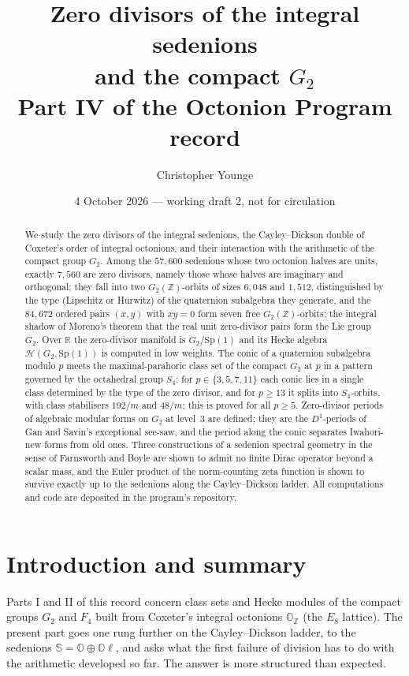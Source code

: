 \documentclass[11pt]{amsart}
\title[Zero divisors of the integral sedenions]{Zero divisors of the integral sedenions\\ and the compact $G_2$\\[4pt] {\normalsize Part IV of the Octonion Program record}}
\author{Christopher Younge}
\date{4 October 2026 --- working draft 2, not for circulation}
\theoremstyle{definition}
\renewcommand{\O}{\mathbb{O}}\newcommand{\Sd}{\mathbb{S}}\newcommand{\Hq}{\mathbb{H}}\newcommand{\Z}{\mathbb{Z}}\newcommand{\Q}{\mathbb{Q}}\newcommand{\R}{\mathbb{R}}\newcommand{\C}{\mathbb{C}}\newcommand{\F}{\mathbb{F}}
\begin{document}
\begin{abstract}
We study the zero divisors of the integral sedenions, the Cayley--Dickson double of Coxeter's order of integral octonions, and their interaction with the arithmetic of the compact group $G_2$. Among the $57{,}600$ sedenions whose two octonion halves are units, exactly $7{,}560$ are zero divisors, namely those whose halves are imaginary and orthogonal; they fall into two $G_2(\Z)$-orbits of sizes $6{,}048$ and $1{,}512$, distinguished by the type (Lipschitz or Hurwitz) of the quaternion subalgebra they generate, and the $84{,}672$ ordered pairs $(x,y)$ with $xy=0$ form seven free $G_2(\Z)$-orbits: the integral shadow of Moreno's theorem that the real unit zero-divisor pairs form the Lie group $G_2$. Over $\R$ the zero-divisor manifold is $G_2/\mathrm{Sp}(1)$ and its Hecke algebra $\mathcal H(G_2,\mathrm{Sp}(1))$ is computed in low weights. The conic of a quaternion subalgebra modulo $p$ meets the maximal-parahoric class set of the compact $G_2$ at $p$ in a pattern governed by the octahedral group $S_4$: for $p\in\{3,5,7,11\}$ each conic lies in a single class determined by the type of the zero divisor, and for $p\ge 13$ it splits into $S_4$-orbits, with class stabilisers $192/m$ and $48/m$; this is proved for all $p\ge 5$. Zero-divisor periods of algebraic modular forms on $G_2$ at level~3 are defined; they are the $D^1$-periods of Gan and Savin's exceptional see-saw, and the period along the conic separates Iwahori-new forms from old ones. Three constructions of a sedenion spectral geometry in the sense of Farnsworth and Boyle are shown to admit no finite Dirac operator beyond a scalar mass, and the Euler product of the norm-counting zeta function is shown to survive exactly up to the sedenions along the Cayley--Dickson ladder. All computations and code are deposited in the program's repository.
\end{abstract}
\maketitle
\tableofcontents

\section{Introduction and summary}
Parts I and II of this record \cite{PartI,PartII} concern class sets and Hecke modules of the compact groups $G_2$ and $F_4$ built from Coxeter's integral octonions $\O_\Z$ (the $E_8$ lattice). The present part goes one rung further on the Cayley--Dickson ladder, to the sedenions $\Sd=\O\oplus\O\ell$, and asks what the first failure of division has to do with the arithmetic developed so far. The answer is more structured than expected.
\end{document}

